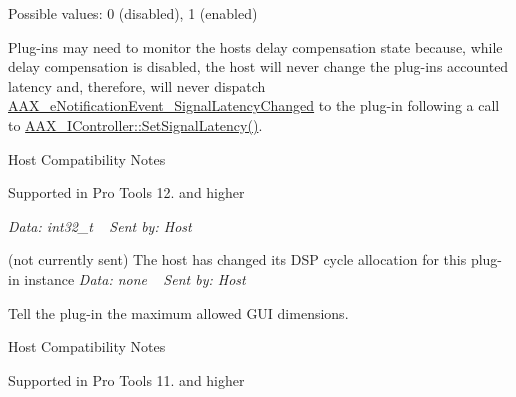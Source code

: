 \begin{Desc}
\begin{description}
Possible values\+: 0 (disabled), 1 (enabled)

Plug-\/ins may need to monitor the host\textquotesingle{}s delay compensation state because, while delay compensation is disabled, the host will never change the plug-\/in\textquotesingle{}s accounted latency and, therefore, will never dispatch \hyperlink{a00206_afab5ea2cfd731fc8f163b6caa685406ea06ab4b075ecb523d0dde3ec19b76a756}{A\+A\+X\+\_\+e\+Notification\+Event\+\_\+\+Signal\+Latency\+Changed} to the plug-\/in following a call to \hyperlink{a00090_af2c648879419d94971c1308d8698601f}{A\+A\+X\+\_\+\+I\+Controller\+::\+Set\+Signal\+Latency()}.

\begin{DoxyRefDesc}{Host Compatibility Notes}
\item[\hyperlink{a00380__compatibility_notes000039}{Host Compatibility Notes}]Supported in Pro Tools 12. and higher\end{DoxyRefDesc}


{\itshape Data\+: {\ttfamily int32\+\_\+t}} ~\newline
 {\itshape Sent by\+: Host} \item[{\em 
\hypertarget{a00206_afab5ea2cfd731fc8f163b6caa685406ea0d9204563b32c3275463aaba44002f04}{}A\+A\+X\+\_\+e\+Notification\+Event\+\_\+\+Cycle\+Count\+Changed\label{a00206_afab5ea2cfd731fc8f163b6caa685406ea0d9204563b32c3275463aaba44002f04}
}](not currently sent) The host has changed its D\+S\+P cycle allocation for this plug-\/in instance {\itshape Data\+: none} ~\newline
 {\itshape Sent by\+: Host} \item[{\em 
\hypertarget{a00206_afab5ea2cfd731fc8f163b6caa685406ea74ab285136093261fd246572659f119c}{}A\+A\+X\+\_\+e\+Notification\+Event\+\_\+\+Max\+View\+Size\+Changed\label{a00206_afab5ea2cfd731fc8f163b6caa685406ea74ab285136093261fd246572659f119c}
}]Tell the plug-\/in the maximum allowed G\+U\+I dimensions. \begin{DoxyRefDesc}{Host Compatibility Notes}
\item[\hyperlink{a00380__compatibility_notes000040}{Host Compatibility Notes}]Supported in Pro Tools 11. and higher\end{DoxyRefDesc}



\end{description}
\end{Desc}
